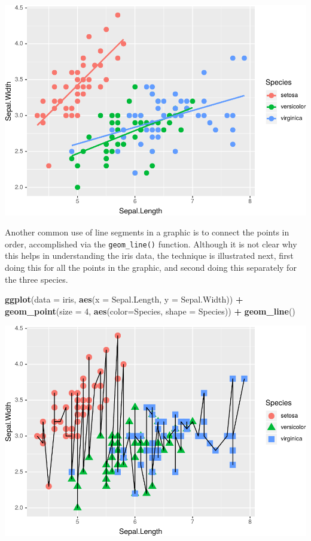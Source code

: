 \documentclass[]{krantz}
\makeatletter
\newenvironment{Shaded}{\begin{snugshade}}{\end{snugshade}}
\newcommand{\DataTypeTok}[1]{\textcolor[rgb]{0.27,0.27,0.27}{#1}}
\newcommand{\DecValTok}[1]{\textcolor[rgb]{0.06,0.06,0.06}{#1}}
\newcommand{\KeywordTok}[1]{\textcolor[rgb]{0.27,0.27,0.27}{\textbf{#1}}}
\newcommand{\NormalTok}[1]{#1}
\newcommand{\OperatorTok}[1]{\textcolor[rgb]{0.43,0.43,0.43}{\textbf{#1}}}
\newcommand{\StringTok}[1]{\textcolor[rgb]{0.5,0.5,0.5}{#1}}
\newenvironment{kframe}{%
\medskip{}
\setlength{\fboxsep}{.8em}
 \def\at@end@of@kframe{}%
 \ifinner\ifhmode%
  \def\at@end@of@kframe{\end{minipage}}%
  \begin{minipage}{\columnwidth}%
 \fi\fi%
 \def\FrameCommand##1{\hskip\@totalleftmargin \hskip-\fboxsep
 \colorbox{shadecolor}{##1}\hskip-\fboxsep
     \hskip-\linewidth \hskip-\@totalleftmargin \hskip\columnwidth}%
 \MakeFramed {\advance\hsize-\width
   \@totalleftmargin\z@ \linewidth\hsize
   \@setminipage}}%
 {\par\unskip\endMakeFramed%
 \at@end@of@kframe}
\renewenvironment{Shaded}{\begin{kframe}}{\end{kframe}}
\makeatother
\begin{document}
\includegraphics{bookdown_files/figure-latex/unnamed-chunk-64-1.pdf}

Another common use of line segments in a graphic is to connect the points in order, accomplished via the \texttt{geom\_line()} function. Although it is not clear why this helps in understanding the iris data, the technique is illustrated next, first doing this for all the points in the graphic, and second doing this separately for the three species.

\begin{Shaded}
\begin{Highlighting}[]
\KeywordTok{ggplot}\NormalTok{(}\DataTypeTok{data =}\NormalTok{ iris, }\KeywordTok{aes}\NormalTok{(}\DataTypeTok{x =}\NormalTok{ Sepal.Length, }\DataTypeTok{y =}\NormalTok{ Sepal.Width)) }\OperatorTok{+}\StringTok{ }
\StringTok{    }\KeywordTok{geom_point}\NormalTok{(}\DataTypeTok{size =} \DecValTok{4}\NormalTok{, }\KeywordTok{aes}\NormalTok{(}\DataTypeTok{color=}\NormalTok{Species, }\DataTypeTok{shape =}\NormalTok{ Species)) }\OperatorTok{+}\StringTok{ }
\StringTok{    }\KeywordTok{geom_line}\NormalTok{()}
\end{Highlighting}
\end{Shaded}

\includegraphics{bookdown_files/figure-latex/unnamed-chunk-65-1.pdf}
\end{document}

